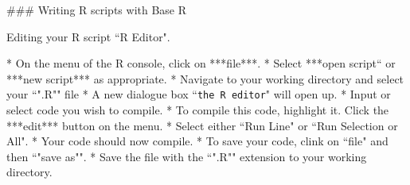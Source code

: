 ### Writing R scripts with Base R

Editing your R script ``R Editor".

* On the menu of the R console, click on ***file***.
* Select ***open script`` or ***new script*** as appropriate.
* Navigate to your working directory and select your ``".R"" file
* A new dialogue box ``\texttt{the R editor}" will open up.
* Input or select code you wish to compile.
* To compile this code, highlight it. Click the ***edit*** button on the menu.
* Select either ``Run Line" or ``Run Selection or All".
* Your code should now compile.
* To save your code, clink on ``file" and then ``"save as"".
* Save the file with the ``".R"" extension to your working directory.
